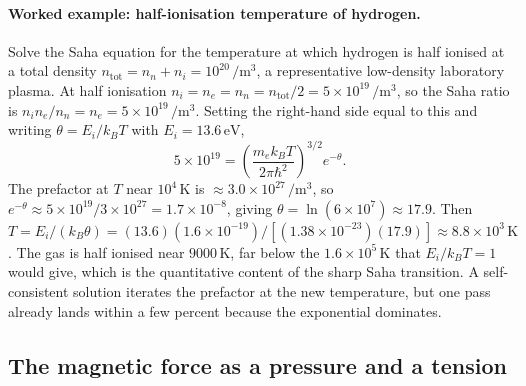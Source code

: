 \paragraph{Worked example: half-ionisation temperature of hydrogen.}
Solve the Saha equation for the temperature at which hydrogen is half
ionised at a total density $n_{\mathrm{tot}} = n_{n} + n_{i} = 10^{20}\,\si{
\per\meter\cubed}$, a representative low-density laboratory plasma. At half
ionisation $n_{i} = n_{e} = n_{n} = n_{\mathrm{tot}}/2 = 5\times 10^{19}\,
\si{\per\meter\cubed}$, so the Saha ratio is $n_{i}n_{e}/n_{n} = n_{e} =
5\times 10^{19}\,\si{\per\meter\cubed}$. Setting the right-hand side equal to
this and writing $\theta = E_{i}/k_{B}T$ with $E_{i} = 13.6\,\text{eV}$,
\[
5\times 10^{19} = \left(\frac{m_{e}k_{B}T}{2\pi\hbar^{2}}\right)^{3/2}
e^{-\theta}.
\]
The prefactor at $T$ near $10^{4}\,\si{\kelvin}$ is $\approx 3.0\times
10^{27}\,\si{\per\meter\cubed}$, so $e^{-\theta} \approx 5\times 10^{19}/
3\times 10^{27} = 1.7\times 10^{-8}$, giving $\theta = \ln(6\times 10^{7})
\approx 17.9$. Then $T = E_{i}/(k_{B}\theta) = (13.6)(1.6\times 10^{-19})/
[(1.38\times 10^{-23})(17.9)] \approx 8.8\times 10^{3}\,\si{\kelvin}$. The
gas is half ionised near $9000\,\si{\kelvin}$, far below the $1.6\times
10^{5}\,\si{\kelvin}$ that $E_{i}/k_{B}T = 1$ would give, which is the
quantitative content of the sharp Saha transition. A self-consistent
solution iterates the prefactor at the new temperature, but one pass already
lands within a few percent because the exponential dominates.

\subsection{The magnetic force as a pressure and a tension}

